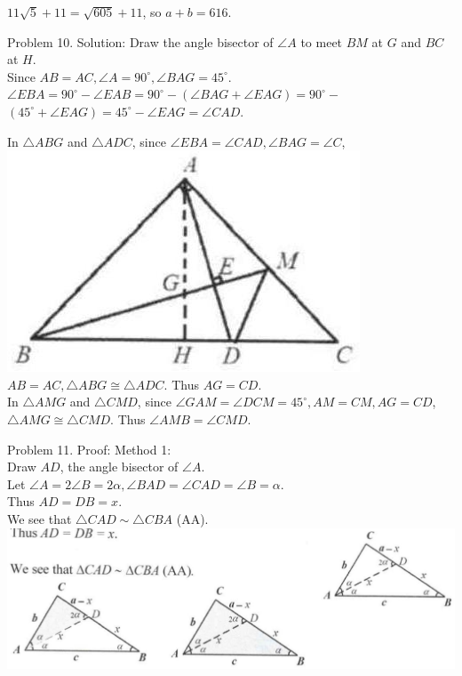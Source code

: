 \documentclass[10pt]{article}
\begin{document}
\(11 \sqrt{5}+11=\sqrt{605}+11\), so \(a+b=616\).

Problem 10. Solution:
Draw the angle bisector of \(\angle A\) to meet \(B M\) at \(G\) and \(B C\) at \(H\).\\
Since \(A B=A C, \angle A=90^{\circ}, \angle B A G=45^{\circ}\).\\
\(\angle E B A=90^{\circ}-\angle E A B=90^{\circ}-(\angle B A G+\angle E A G)=90^{\circ}-\) \(\left(45^{\circ}+\angle E A G\right)=45^{\circ}-\angle E A G=\angle C A D\).

In \(\triangle A B G\) and \(\triangle A D C\), since \(\angle E B A=\angle C A D, \angle B A G=\angle C\),\\
\includegraphics[max width=\textwidth]{2025_04_17_97bc1f7e44d93c271a88g-071} \(A B=A C, \triangle A B G \cong \triangle A D C\). Thus \(A G=C D\).\\
In \(\triangle A M G\) and \(\triangle C M D\), since \(\angle G A M=\angle D C M=45^{\circ}, A M=C M, A G=C D\), \(\triangle A M G \cong \triangle C M D\). Thus \(\angle A M B=\angle C M D\).

Problem 11. Proof:
Method 1:\\
Draw \(A D\), the angle bisector of \(\angle A\).\\
Let \(\angle A=2 \angle B=2 \alpha, \angle B A D=\angle C A D=\angle B=\alpha\).\\
Thus \(A D=D B=x\).\\
We see that \(\triangle C A D \sim \triangle C B A\) (AA).\\
\includegraphics[max width=\textwidth, center]{2025_04_17_97bc1f7e44d93c271a88g-071(1)}
\end{document}
